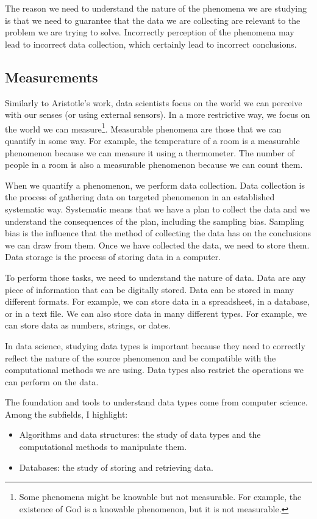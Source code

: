 The reason we need to understand the nature of the phenomena we are studying is that we
need to guarantee that the data we are collecting are relevant to the problem we are
trying to solve.  Incorrectly perception of the phenomena may lead to incorrect data
collection, which certainly lead to incorrect conclusions.

\subsection{Measurements}

Similarly to Aristotle's work, data scientists focus on the world we can perceive with our
senses (or using external sensors).  In a more restrictive way, we focus on the world we
can measure\footnote{Some phenomena might be knowable but not measurable.  For example,
the existence of God is a knowable phenomenon, but it is not measurable.}. Measurable
phenomena are
those that we can quantify in some way.  For example, the temperature of a room is a
measurable phenomenon because we can measure it using a thermometer.  The number of
people in a room is also a measurable phenomenon because we can count them.

When we quantify a phenomenon, we perform data collection.  Data collection is the process
of gathering data on targeted phenomenon in an established systematic way.
Systematic means that we have a plan to collect the data and we understand the
consequences of the plan, including the sampling bias.  Sampling bias is the influence
that the method of collecting the data has on the conclusions we can draw from them.
Once we have collected the data, we need to store them.  Data storage is the process of
storing data in a computer.

To perform those tasks, we need to understand the nature of data.  Data are any piece of
information that can be digitally stored.  Data can be stored in many different formats.
For example, we can store data in a spreadsheet, in a database, or in a text file.  We can
also store data in many different types.  For example, we can store data as numbers,
strings, or dates.

In data science, studying data types is important because they need to correctly reflect
the nature of the source phenomenon and be compatible with the computational methods we
are using.  Data types also restrict the operations we can perform on the data.

The foundation and tools to understand data types come from computer science.  Among the
subfields, I highlight:
\begin{itemize}
  \itemsep0em
  \item Algorithms and data structures: the study of data types and the computational
    methods to manipulate them.
  \item Databases: the study of storing and retrieving data.
\end{itemize}

